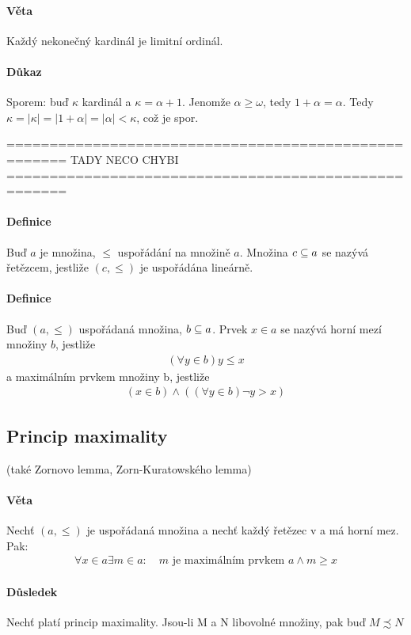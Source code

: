 \documentclass[a4paper,12pt,titlepage]{article}
\begin{document}
\paragraph{Věta}
Každý nekonečný kardinál je limitní ordinál.
\paragraph{Důkaz}
Sporem: buď $\kappa$ kardinál a $\kappa = \alpha + 1$. Jenomže $\alpha \ge
\omega$, tedy $1 + \alpha = \alpha$. Tedy $\kappa = |\kappa| = |1+\alpha| =
|\alpha| < \kappa$, což je spor.


=====================================================
TADY NECO CHYBI
=====================================================


\paragraph{Definice}
Buď $a$ je množina, $\le$ uspořádání na množině $a$. Množina $c \subseteq a$ se nazývá
řetězcem, jestliže $(c, \le)$ je uspořádána lineárně.
\paragraph{Definice}
Buď $(a, \le)$ uspořádaná množina, $b \subseteq a$. Prvek $x \in a$ se nazývá horní
mezí množiny $b$, jestliže 
\begin{align}
	(\forall y \in b) y \le x
\end{align}
a maximálním prvkem množiny b, jestliže
\begin{align}
	(x \in b) \land ((\forall y \in b) \neg y > x)
\end{align}

\subsection{Princip maximality}
\setcounter{equation}{0}
(také Zornovo lemma, Zorn-Kuratowského lemma)
\paragraph{Věta}
Nechť $(a, \le)$ je uspořádaná množina a nechť každý řetězec v a má horní mez.
Pak:
\begin{align}
	\forall x \in a \exists m \in a: \quad m \text{ je maximálním prvkem } a
	\land m \ge x
\end{align}
\paragraph{Důsledek}
Nechť platí princip maximality. Jsou-li M a N libovolné množiny, pak buď $M
\precsim N$
\end{document}
